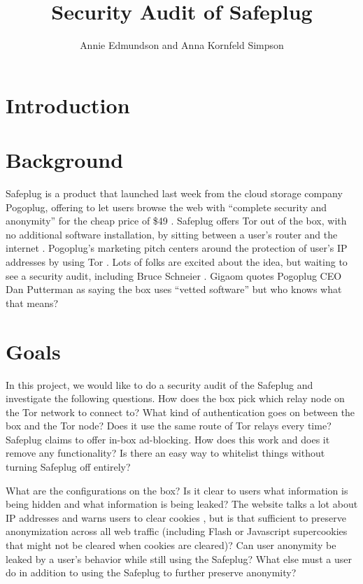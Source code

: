 \documentclass[12pt, letterpaper]{article}
\title{Security Audit of Safeplug}
\author{Annie Edmundson and Anna Kornfeld Simpson}
\begin{document}
\maketitle

\section{Introduction}

\section{Background}
Safeplug is a product that launched last week from the cloud storage company Pogoplug, offering to let users browse the web with “complete security and anonymity” for the cheap price of \$49 \cite{safeplug}.  Safeplug offers Tor out of the box, with no additional software installation, by sitting between a user’s router and the internet \cite{wired}.  Pogoplug’s marketing pitch centers around the protection of user’s IP addresses by using Tor \cite{safeplug,bittech}.  Lots of folks are excited about the idea, but waiting to see a security audit, including Bruce Schneier \cite{schneier}.  Gigaom quotes Pogoplug CEO Dan Putterman as saying the box uses “vetted software” \cite{gigaom} but who knows what that means?

\section{Goals}
In this project, we would like to do a security audit of the Safeplug and investigate the following questions.  How does the box pick which relay node on the Tor network to connect to?  What kind of authentication goes on between the box and the Tor node?  Does it use the same route of Tor relays every time?
Safeplug claims to offer in-box ad-blocking.  How does this work and does it remove any functionality?  Is there an easy way to whitelist things without turning Safeplug off entirely?

What are the configurations on the box?  Is it clear to users what information is being hidden and what information is being leaked?  The website talks a lot about IP addresses and warns users to clear cookies \cite{safeplug}, but is that sufficient to preserve anonymization across all web traffic (including Flash or Javascript supercookies that might not be cleared when cookies are cleared)?  Can user anonymity be leaked by a user’s behavior while still using the Safeplug?  What else must a user do in addition to using the Safeplug to further preserve anonymity?
\end{document}

